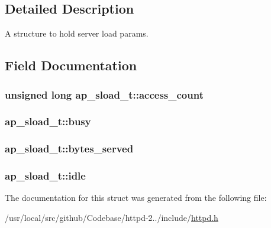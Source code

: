 \subsection{Detailed Description}
A structure to hold server load params. 

\subsection{Field Documentation}
\subsubsection[{\texorpdfstring{access\+\_\+count}{access_count}}]{\setlength{\rightskip}{0pt plus 5cm}unsigned long ap\+\_\+sload\+\_\+t\+::access\+\_\+count}\hypertarget{structap__sload__t_a2dd1914b61a43168e24498722e54b105}{}\label{structap__sload__t_a2dd1914b61a43168e24498722e54b105}
\subsubsection[{\texorpdfstring{busy}{busy}}]{ ap\+\_\+sload\+\_\+t\+::busy}\hypertarget{structap__sload__t_abafc49c09a4aa861150eec148017c554}{}\label{structap__sload__t_abafc49c09a4aa861150eec148017c554}
\subsubsection[{\texorpdfstring{bytes\+\_\+served}{bytes_served}}]{ ap\+\_\+sload\+\_\+t\+::bytes\+\_\+served}\hypertarget{structap__sload__t_a1e7db52118b8ac164a98e6894ea36b0b}{}\label{structap__sload__t_a1e7db52118b8ac164a98e6894ea36b0b}
\subsubsection[{\texorpdfstring{idle}{idle}}]{ ap\+\_\+sload\+\_\+t\+::idle}\hypertarget{structap__sload__t_a8d5bd61e31760519a3c79e57e509711b}{}\label{structap__sload__t_a8d5bd61e31760519a3c79e57e509711b}


The documentation for this struct was generated from the following file\+:\begin{DoxyCompactItemize}
\item 
/usr/local/src/github/\+Codebase/httpd-\/2../include/\hyperlink{httpd_8h}{httpd.\+h}\end{DoxyCompactItemize}
